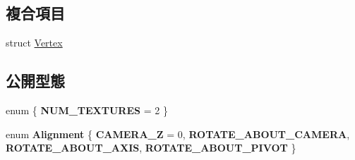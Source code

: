 \subsection*{複合項目}
\begin{DoxyCompactItemize}
\item 
struct \hyperlink{struct_magnum_1_1_bill_board_1_1_vertex}{Vertex}
\end{DoxyCompactItemize}
\subsection*{公開型態}
\begin{DoxyCompactItemize}
\item 
enum \{ {\bfseries N\+U\+M\+\_\+\+T\+E\+X\+T\+U\+R\+ES} = 2
 \}\hypertarget{class_magnum_1_1_bill_board_af17e3a8dd42172db7ef61a67b3142448}{}\label{class_magnum_1_1_bill_board_af17e3a8dd42172db7ef61a67b3142448}

\item 
enum {\bfseries Alignment} \{ {\bfseries C\+A\+M\+E\+R\+A\+\_\+Z} = 0, 
{\bfseries R\+O\+T\+A\+T\+E\+\_\+\+A\+B\+O\+U\+T\+\_\+\+C\+A\+M\+E\+RA}, 
{\bfseries R\+O\+T\+A\+T\+E\+\_\+\+A\+B\+O\+U\+T\+\_\+\+A\+X\+IS}, 
{\bfseries R\+O\+T\+A\+T\+E\+\_\+\+A\+B\+O\+U\+T\+\_\+\+P\+I\+V\+OT}
 \}\hypertarget{class_magnum_1_1_bill_board_a3f1e4105ac9bb86fc6097999d3a79aa1}{}\label{class_magnum_1_1_bill_board_a3f1e4105ac9bb86fc6097999d3a79aa1}

\end{DoxyCompactItemize}
